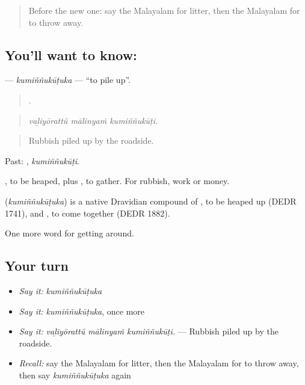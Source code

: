 \label{lesson:ML-C504-kuminnukutuka}



\begin{quote}
Before the new one: say the Malayalam for litter, then the Malayalam for to throw away.
\end{quote}

\subsection*{You'll want to know: }
\textbf{} — \emph{kumiññukūṭuka} — \textquotedblleft{}to pile up\textquotedblright{}.

\begin{quote}
  .
\end{quote}

\begin{quote}
\emph{vaḻiyōrattŭ mālinyaṁ kumiññukūṭi.}
\end{quote}

\begin{quote}
Rubbish piled up by the roadside.
\end{quote}

Past: , \emph{kumiññukūṭi}.

, to be heaped, plus , to gather. For rubbish, work or money.

\begin{cousinweb}
\textbf{} (\emph{kumiññukūṭuka}) is a native Dravidian compound of , to be heaped up (DEDR 1741), and , to come together (DEDR 1882).
\end{cousinweb}

\begin{grammarlens}[title={What you've built}]
One more word for getting around.
\end{grammarlens}

\subsection*{Your turn}
\begin{itemize}
\raggedright
  \item \emph{Say it:} \emph{kumiññukūṭuka}
  \item \emph{Say it:} \emph{kumiññukūṭuka}, once more
  \item \emph{Say it:} \emph{vaḻiyōrattŭ mālinyaṁ kumiññukūṭi.} — Rubbish piled up by the roadside.
  \item \emph{Recall:} say the Malayalam for litter, then the Malayalam for to throw away, then say \emph{kumiññukūṭuka} again
\end{itemize}

